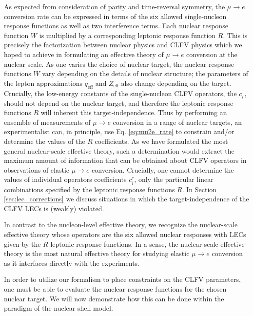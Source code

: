 \documentclass{book}[12pt]
\begin{document}
As expected from consideration of parity and time-reversal symmetry, the $\mu\rightarrow e$ conversion rate can be expressed in terms of the six allowed single-nucleon response functions as well as two interference terms. Each nuclear response function $W$ is multiplied by a corresponding leptonic response function $R$. This is precisely the factorization between nuclear physics and CLFV physics which we hoped to achieve in formulating an effective theory of $\mu\rightarrow e$ conversion at the nuclear scale. As one varies the choice of nuclear target, the nuclear response functions $W$ vary depending on the details of nuclear structure; the parameters of the lepton approximations $q_\mathrm{eff}$ and $Z_\mathrm{eff}$ also change depending on the target. Crucially, the low-energy constants of the single-nucleon CLFV operators, the $c_i^{\tau}$, should not depend on the nuclear target, and therefore the leptonic response functions $R$ will inherent this target-independence. Thus by performing an ensemble of measurements of $\mu\rightarrow e$ conversion in a range of nuclear targets, an experimentalist can, in principle, use Eq. \ref{eq:mu2e_rate} to constrain and/or determine the values of the $R$ coefficients. As we have formulated  the most general nuclear-scale effective theory, such a determination would extract the maximum amount of information that can be obtained about CLFV operators in observations of elastic $\mu\rightarrow e$ conversion. Crucially, one cannot determine the values of individual operators coefficients $c_i^{\tau}$, only the particular linear combinations specified by the leptonic response functions $R$. In Section \ref{sec:lec_corrections} we discuss situations in which the target-independence of the CLFV LECs is (weakly) violated.  

In contrast to the nucleon-level effective theory, we recognize the nuclear-scale effective theory whose operators are the six allowed nuclear responses with LECs given by the $R$ leptonic response functions. In a sense, the nuclear-scale effective theory is the most natural effective theory for studying elastic $\mu\rightarrow e$ conversion as it interfaces directly with the experiments.

In order to utilize our formalism to place constraints on the CLFV parameters, one must be able to evaluate the nuclear response functions for the chosen nuclear target. We will now demonstrate how this can be done within the paradigm of the nuclear shell model.
\end{document}
